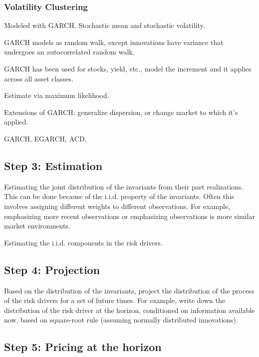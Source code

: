 \subsubsection{Volatility Clustering}

Modeled with GARCH. Stochastic mean and stochastic volatility. 

GARCH models as random walk, except innovations have variance that undergoes an autocorrelated random walk. 

GARCH has been used for stocks, yield, etc., model the increment and it applies across all asset classes. 

Estimate via maximum likelihood. 

Extensions of GARCH: generalize dispersion, or change market to which it's applied.

GARCH, EGARCH, ACD, 





\subsection{Step 3: Estimation}

Estimating the joint distribution of the invariants from their past realizations. This can be done because of the i.i.d. property of the invariants. Often this involves assigning different weights to different observations. For example, emphasizing more recent observations or emphasizing observations is more similar market environments.

Estimating the i.i.d. components in the risk drivers.








\subsection{Step 4: Projection}

Based on the distribution of the invariants, project the distribution of the process of the risk drivers for a set of future times. For example, write down the distribution of the risk driver at the horizon, conditioned on information available now, based on square-root rule (assuming normally distributed innovations). 

\subsection{Step 5: Pricing at the horizon}

